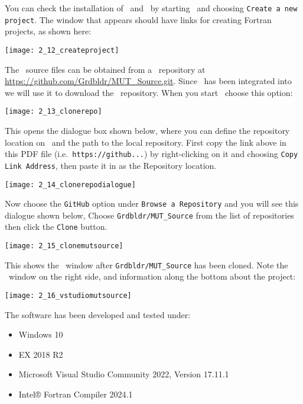 You can check the installation of \vstudio\ and \ifort\ by starting \vstudio\ and choosing \texttt{Create a new project}.  The window that appears should have  links for creating Fortran projects, as shown here:

\texttt{[image: 2\_12\_createproject]}

The \mut\ source files can be obtained from a \github\ repository at \url{https://github.com/Grdbldr/MUT_Source.git}.  Since \github\ has been integrated into \vstudio\, we will use it to download the \mut\ repository.  When you start \vstudio\, choose this option:

\texttt{[image: 2\_13\_clonerepo]}

This opens the dialogue box shown below, where you can define the repository location on \github\ and the path to the local repository.  First copy the link above  in this PDF file (i.e.\ {\tt https://github...}) by right-clicking on it and choosing \texttt{Copy Link Address}, then paste it in as the {\sf Repository location}.

\texttt{[image: 2\_14\_clonerepodialogue]}

Now choose the \texttt{GitHub} option under \texttt{Browse a Repository} and you will see this dialogue shown below, Choose \texttt{Grdbldr/MUT\_Source} from the list of repositories then click the \texttt{Clone} button.

  \texttt{[image: 2\_15\_clonemutsource]}

This shows the \vstudio\ window after \texttt{Grdbldr/MUT\_Source} has been cloned. Note the \github\ window on the right side, and information along the bottom about the project:

    \texttt{[image: 2\_16\_vstudiomutsource]}


The software has been developed and tested under:
\begin{itemize}
    \item Windows 10
    \item {} EX 2018 R2
    \item Microsoft Visual Studio Community 2022, Version 17.11.1
    \item Intel® Fortran Compiler   2024.1
\end{itemize} 